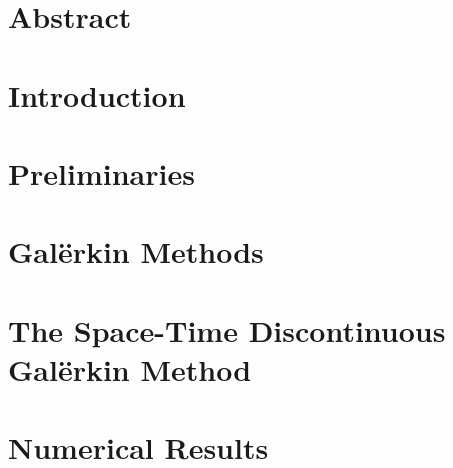 
\chapter*{Abstract}
\thispagestyle{fancy}



\newpage
\tableofcontents
\thispagestyle{fancy}



\newpage
\chapter{Introduction}
\thispagestyle{fancy}





\newpage
\chapter{Preliminaries}
\thispagestyle{fancy}




\newpage
\chapter{Galërkin Methods}
\thispagestyle{fancy}


\newpage
\chapter{The Space-Time Discontinuous Galërkin Method}
\thispagestyle{fancy}


\newpage
\chapter{Numerical Results}
\thispagestyle{fancy}





\newpage
{}

\printbibliography
\thispagestyle{fancy}